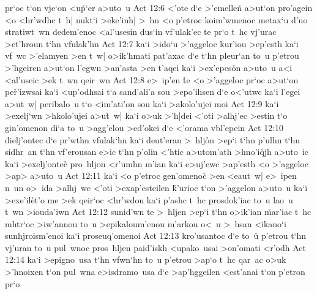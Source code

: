 pr`oc
t`on
vje`on
<u\r{p}`er
a>uto~u\bibvsend
\vs Act 12:6
<'ote
d`e
>'emellen\r{}
a>ut`on
pro'agein
<o
<hr'wdhc
t~h|
nukt`i
>eke'inh|
>~hn
<o
p'etroc
koim'wmenoc
metax`u
d'uo
stratiwt~wn
dedem'enoc
<al'usesin
dus`in
vf'ulak'ec
te
pr`o
t~hc
vj'urac
>et'hroun
t`hn
vfulak'hn\bibvsend
\vs Act 12:7
ka`i
>ido`u
>'aggeloc
kur'iou
>ep'esth
ka`i
vf~wc
>'elamyen
>en
t~w|
o>ik'hmati
pat'axac
d`e
t`hn
pleur`an
to~u
p'etrou
>'hgeiren
a>ut`on
l'egwn
>an'asta
>en
t'aqei
ka`i
>ex'epes\r{o}n
a>uto~u
a<i
<al'useic
>ek
t~wn
qeir~wn\bibvsend
\vs Act 12:8
e>~ip'en
\r{t}e
<o
>'aggeloc
pr`oc
a>ut`on
pe\r{r}'izwsai
ka`i
<up'odhsai
t`a
sand'ali'a
sou
>epo'ihsen
d`e
o<'utwc
ka`i
l'egei
a>ut~w|
peribalo~u
t`o
<im'ati'on
sou
ka`i
>akolo'ujei
moi\bibvsend
\vs Act 12:9
ka`i
>exelj`wn
>hkolo'ujei
a>u\r{t}~w|
ka`i
o>uk
>'h|dei
<'oti
>alhj'ec
>estin
t`o
gin'omenon
di`a
to~u
>agg'elou
>ed'okei
d`e
<'orama
vbl'epein\bibvsend
\vs Act 12:10
dielj'ontec
d`e
pr'wthn
vfulak`hn
ka`i
deut'eran
>~hlj\r{o}n
>ep`i
t`hn
p'ulhn
t`hn
sidhr~an
t`hn
vf'erousan
e>ic
t`hn
p'olin
<'htic
a>utom'ath
>hno'i\r{q}jh
a>uto~ic
ka`i
>exelj'onte\r{c}
pro~hljon
<r'umhn
m'ian
ka`i
e>uj'ewc
>ap'esth
<o
>'aggeloc
>ap>
a>uto~u\bibvsend
\vs Act 12:11
ka`i
<o
p'etroc
gen'omenoc\r{}
>en
<eaut~w|
e>~ipen
n~un
o>~ida
>alhj~wc
<'oti
>exap'esteilen
\r{k}'urioc
t`on
>'aggelon
a>uto~u
ka`i
>exe'il\r{e}t'o
me
>ek
qeir`oc
<hr'wdou
ka`i
p'ashc
t~hc
prosdok'iac
to~u
lao~u
t~wn
>iouda'iwn\bibvsend
\vs Act 12:12
sunid'wn
te
>~hljen
>ep`i
t`hn
o>ik'ian
\r{m}ar'iac
t~hc
mhtr`oc
>iw'annou
to~u
>epikaloum'enou
m'arkou
o<~u
>~hsan
<ikano`i
sunhjroism'enoi
ka`i
proseuq'omenoi\bibvsend
\vs Act 12:13
kro'usantoc
d`e
to~u\r{}
p'etrou
t`hn
vj'uran
to~u
pul~wnoc
pros~hljen
paid'iskh
<upako~usai
>on'omati
<r'odh\bibvsend
\vs Act 12:14
ka`i
>epigno~usa
t`hn
vfwn`hn
to~u
p'etrou
>ap`o
t~hc
qar~ac
o>uk
>'hnoixen
t`on
pul~wna
e>isdramo~usa
d`e
>ap'hggeilen
<est'anai
t`on
p'etron
pr`o
